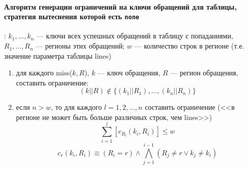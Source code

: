 \paragraph{Алгоритм генерации ограничений на ключи обращений для таблицы, стратегия вытеснения которой есть \texttt{none}}: $k_1, ..., k_n$ --- ключи всех успешных обращений в таблицу с попаданиями, $R_1, ..., R_n$ --- регионы этих обращений; $w$ --- количество строк в регионе (т.е. значение параметра таблицы lines)

\begin{enumerate}
    \item для каждого miss($k, R$), $k$ --- ключ обращения, $R$ --- регион
обращения, составить ограничение: $$(k||R) \notin \{(k_1||R_1), ..., (k_n||R_n)
\}$$

    \item если $n > w$, то для каждого $l = 1, 2, \dots, n$ составить
ограничение (<<в регионе не может быть больше различных строк, чем lines>>)
$$\sum_{i=1}^l [c_{R_l} (k_i, R_i)] \leqslant w$$
$$c_r (k_i, R_i) \equiv (R_i = r ) \wedge \bigwedge_{j=1}^{i-1} (R_j \neq r \vee k_j \neq k_i)$$
\end{enumerate}


